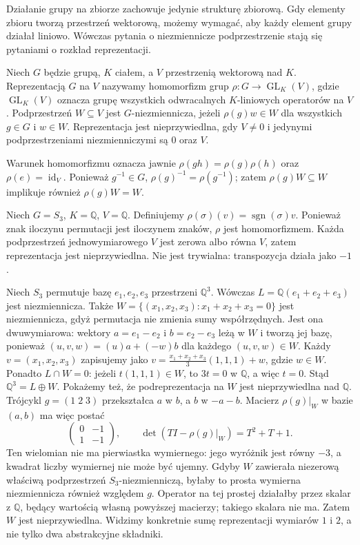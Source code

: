 Działanie grupy na zbiorze zachowuje jedynie strukturę zbiorową.
Gdy elementy zbioru tworzą przestrzeń wektorową, możemy wymagać,
aby każdy element grupy działał liniowo. Wówczas pytania o niezmiennicze
podprzestrzenie stają się pytaniami o rozkład reprezentacji.
\begin{definicja}\label{aa:def:representation}
Niech $G$ będzie grupą, $K$ ciałem, a $V$ przestrzenią wektorową nad $K$.
Reprezentacją $G$ na $V$ nazywamy homomorfizm grup
$\rho:G\to\operatorname{GL}_K(V)$, gdzie $\operatorname{GL}_K(V)$
oznacza grupę wszystkich odwracalnych $K$-liniowych operatorów na $V$.
Podprzestrzeń $W\subseteq V$ jest $G$-niezmiennicza, jeżeli
$\rho(g)w\in W$ dla wszystkich $g\in G$ i $w\in W$.
Reprezentacja jest nieprzywiedlna, gdy $V\ne0$ i jedynymi
podprzestrzeniami niezmienniczymi są $0$ oraz $V$.
\end{definicja}
Warunek homomorfizmu oznacza jawnie $\rho(gh)=\rho(g)\rho(h)$
oraz $\rho(e)=\operatorname{id}_V$. Ponieważ $g^{-1}\in G$,
$\rho(g)^{-1}=\rho(g^{-1})$; zatem $\rho(g)W\subseteq W$
implikuje również $\rho(g)W=W$.
\begin{przyklad}\label{aa:prz:sign-rep}
Niech $G=S_3$, $K=\mathbb Q$, $V=\mathbb Q$.
Definiujemy $\rho(\sigma)(v)=\operatorname{sgn}(\sigma)v$.
Ponieważ znak iloczynu permutacji jest iloczynem znaków,
$\rho$ jest homomorfizmem. Każda podprzestrzeń jednowymiarowego
$V$ jest zerowa albo równa $V$, zatem reprezentacja jest
nieprzywiedlna. Nie jest trywialna: transpozycja działa jako $-1$.
\end{przyklad}
\begin{przyklad}\label{aa:prz:permutation-rep}
Niech $S_3$ permutuje bazę $e_1,e_2,e_3$ przestrzeni $\mathbb Q^3$.
Wówczas $L=\mathbb Q(e_1+e_2+e_3)$ jest niezmiennicza.
Także $W=\{(x_1,x_2,x_3):x_1+x_2+x_3=0\}$ jest niezmiennicza,
gdyż permutacja nie zmienia sumy współrzędnych.
Jest ona dwuwymiarowa: wektory $a=e_1-e_2$ i
$b=e_2-e_3$ leżą w $W$ i tworzą jej bazę, ponieważ
$(u,v,w)=(u)a+(-w)b$ dla każdego $(u,v,w)\in W$.
Każdy $v=(x_1,x_2,x_3)$ zapisujemy jako
$v=\frac{x_1+x_2+x_3}{3}(1,1,1)+w$, gdzie $w\in W$.
Ponadto $L\cap W=0$: jeżeli $t(1,1,1)\in W$, to
$3t=0$ w $\mathbb Q$, a więc $t=0$.
Stąd $\mathbb Q^3=L\oplus W$.
Pokażemy też, że podreprezentacja na $W$ jest
nieprzywiedlna nad $\mathbb Q$. Trójcykl
$g=(1\;2\;3)$ przekształca $a$ w $b$, a $b$ w
$-a-b$. Macierz $\rho(g)|_W$ w bazie $(a,b)$ ma więc
postać
\[
\begin{pmatrix}0&-1\\1&-1\end{pmatrix},
\qquad \det(TI-\rho(g)|_W)=T^2+T+1.
\]
Ten wielomian nie ma pierwiastka wymiernego: jego
wyróżnik jest równy $-3$, a kwadrat liczby wymiernej
nie może być ujemny. Gdyby $W$ zawierała niezerową
właściwą podprzestrzeń $S_3$-niezmienniczą, byłaby to
prosta wymierna niezmiennicza również względem $g$.
Operator na tej prostej działałby przez skalar z
$\mathbb Q$, będący wartością własną powyższej macierzy;
takiego skalara nie ma. Zatem $W$ jest nieprzywiedlna.
Widzimy konkretnie sumę reprezentacji wymiarów $1$ i $2$,
a nie tylko dwa abstrakcyjne składniki.
\end{przyklad}
